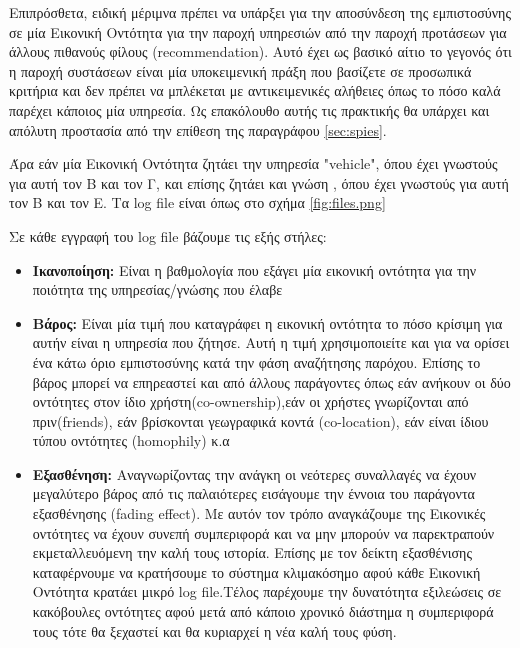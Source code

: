 Επιπρόσθετα, ειδική μέριμνα πρέπει να υπάρξει για την αποσύνδεση της εμπιστοσύνης σε μία Εικονική Οντότητα για την παροχή υπηρεσιών από την παροχή προτάσεων για άλλους πιθανούς φίλους (recommendation). Αυτό έχει ως βασικό αίτιο το γεγονός ότι η παροχή συστάσεων είναι μία υποκειμενική πράξη που βασίζετε σε προσωπικά κριτήρια και δεν πρέπει να μπλέκεται με αντικειμενικές αλήθειες όπως το πόσο καλά παρέχει κάποιος μία υπηρεσία. Ως επακόλουθο αυτής τις πρακτικής θα υπάρχει και απόλυτη προστασία από την επίθεση της παραγράφου \ref{sec:spies}.

Άρα εάν μία Εικονική Οντότητα ζητάει την υπηρεσία "vehicle", όπου έχει γνωστούς για αυτή τον Β και τον Γ, και επίσης ζητάει και γνώση , όπου έχει γνωστούς για αυτή τον Β και τον Ε. Τα log file είναι όπως στο σχήμα \ref{fig:files.png}
\newpage
{}


Σε κάθε εγγραφή του log file βάζουμε τις εξής στήλες:
\begin{itemize}

\item \textbf{Ικανοποίηση:} Είναι η βαθμολογία που εξάγει μία εικονική οντότητα για την ποιότητα της υπηρεσίας/γνώσης που έλαβε

\item \textbf{Βάρος:} Είναι μία τιμή που καταγράφει η εικονική οντότητα το πόσο κρίσιμη για αυτήν είναι η υπηρεσία που ζήτησε. Αυτή η τιμή χρησιμοποιείτε και για να ορίσει ένα κάτω όριο εμπιστοσύνης κατά την φάση αναζήτησης παρόχου. Επίσης το βάρος μπορεί να επηρεαστεί και από άλλους παράγοντες όπως εάν ανήκουν οι δύο οντότητες στον ίδιο χρήστη(co-ownership),εάν οι χρήστες γνωρίζονται από πριν(friends), εάν βρίσκονται γεωγραφικά κοντά (co-location), εάν είναι ίδιου τύπου οντότητες (homophily) κ.α

\item \textbf{Εξασθένηση:} Αναγνωρίζοντας την ανάγκη οι νεότερες συναλλαγές να έχουν μεγαλύτερο βάρος από τις παλαιότερες εισάγουμε την έννοια του παράγοντα εξασθένησης (fading effect). Με αυτόν τον τρόπο αναγκάζουμε της Εικονικές οντότητες να έχουν συνεπή συμπεριφορά και να μην μπορούν να παρεκτραπούν εκμεταλλευόμενη την καλή τους ιστορία. Επίσης με τον δείκτη εξασθένισης καταφέρνουμε να κρατήσουμε το σύστημα κλιμακόσημο αφού κάθε Εικονική Οντότητα κρατάει μικρό log file.Τέλος παρέχουμε την δυνατότητα εξιλεώσεις σε κακόβουλες οντότητες αφού μετά από κάποιο χρονικό διάστημα η συμπεριφορά τους τότε θα ξεχαστεί και θα κυριαρχεί η νέα καλή τους φύση.

\end{itemize}

